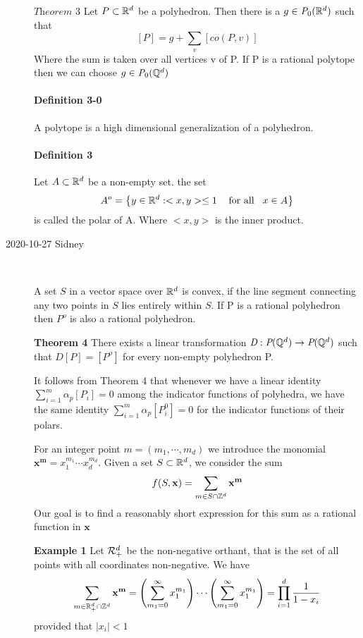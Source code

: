 \begin{description}
$\textit{Theorem 3}$ Let $P\subset\mathbb{R}^d$ be a polyhedron. Then there is a $g\in\textit{P}_0(\mathbb{R}^d)$ such that
$$[P]=g+\sum_v[co(P,v)]$$
Where the sum is taken over all vertices v of P. If P is a rational polytope then we can choose $g\in\textit{P}_0({\mathbb{Q}}^d)$

\paragraph{Definition 3-0}
A polytope is a high dimensional generalization of a polyhedron.

\paragraph{Definition  3} Let $A\subset\mathbb{R}^d$ be a non-empty set. the set
$$A^o=\left\lbrace y\in\mathbb{R}^d:<x,y>\leq 1 \hspace{3mm}\mbox{ for all}\hspace{3mm}x\in A\right\rbrace$$
is called the polar of A. Where $<x,y>$ is the inner product.

\item[2020-10-27 Sidney]~

A set $S$ in a vector space over $\mathbb{R}^d$ is convex, if the line segment
connecting any two points in $S$ lies entirely within $S$. If P is a
rational polyhedron then $P^o$ is also a rational polyhedron.

\textbf{Theorem 4}
There exists a linear transformation
$\textit{D}:\textit{P}({\mathbb{Q}}^d)\rightarrow\textit{P}({\mathbb{Q}}^d)$ such that
$\textit{D}[P]=[P^o]$ for every non-empty polyhedron P.

It follows from Theorem 4 that whenever we have a linear identity
$\sum^m_{i=1}\alpha_p[P_i]=0$ among the indicator functions of polyhedra,
we have the same identity $\sum^m_{i=1}\alpha_p[P_i^0]=0$ for the
indicator functions of their polars.

For an integer point $m=(m_1,\cdots ,m_d)$ we introduce the monomial $\mathbf{x}^\mathbf{m}=x_1^{m_1}\cdots x_d^{m_d}$. Given a set $S\subset \mathbb{R}^d$, we consider the sum
$$f(S,\mathbf{x})=\sum_{m\in S\cap\mathbb{Z}^d}\mathbf{x}^\mathbf{m}$$
Our goal is to find a reasonably short expression for this sum as a rational function in $\mathbf{x}$

\textbf{Example 1}
Let $\mathcal{R}_+^d$ be the non-negative orthant, that is the set of all points with all coordinates non-negative. We have
$$\sum_{m\in\mathbb{R}^d_+\cap\mathbb{Z}^d}\mathbf{x}^\mathbf{m}=\left(\sum^{\infty}_{m_1=0}x_1^{m_1}\right)\cdots\left(\sum^{\infty}_{m_1=0}x_1^{m_1}\right)=\prod_{i=1}^d\frac{1}{1-x_i}$$
provided that $|x_i|<1$


\end{description}
